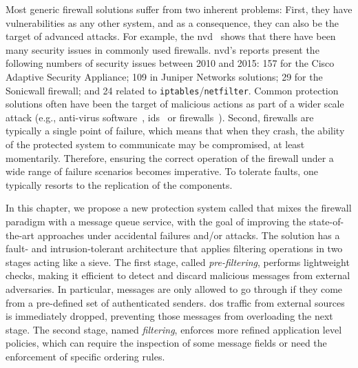 Most generic firewall solutions suffer from two inherent problems: 
First, they have vulnerabilities as any other system, and as a consequence, they can also be the target of advanced attacks. 
For example, the \gls{nvd}~\cite{nvd} shows that there have been many security issues in commonly used firewalls. 
\gls{nvd}'s reports present the following numbers of security issues between 2010 and 2015: 157 for the Cisco Adaptive Security Appliance; 109 in Juniper Networks solutions; 29 for the Sonicwall firewall; and 24 related to \texttt{iptables}/\texttt{netfilter}. 
Common protection solutions often have been the target of malicious actions as part of a wider scale attack (e.g., anti-virus software~\cite{Chauhan:2011}, \gls{ids}~\cite{Anderson:2001} or firewalls~\cite{Kamara:2003,Surisetty:2010,cisco1,cisco2}).
Second, firewalls are typically a single point of failure, which means that when they crash, the ability of the protected system to communicate may be compromised, at least momentarily.
Therefore, ensuring the correct operation of the firewall under a wide range of failure scenarios becomes imperative.
To tolerate faults, one typically resorts to the replication of the components.



In this chapter, we propose a new protection system called \sieveq that mixes the firewall paradigm with a message queue service, with the goal of improving the state-of-the-art approaches under accidental failures and/or attacks.
The solution has a fault- and intrusion-tolerant architecture that applies filtering operations in two stages acting like a sieve.
The first stage, called \emph{pre-filtering}, performs lightweight checks, making it efficient to detect and discard malicious messages from external adversaries.
In particular, messages are only allowed to go through if they come from a pre-defined set of authenticated senders.
\gls{dos} traffic from external sources is immediately dropped, preventing those messages from overloading the next stage.
The second stage, named \emph{filtering}, enforces more refined application level policies, which can require the inspection of some message fields or need the enforcement of specific ordering rules.


